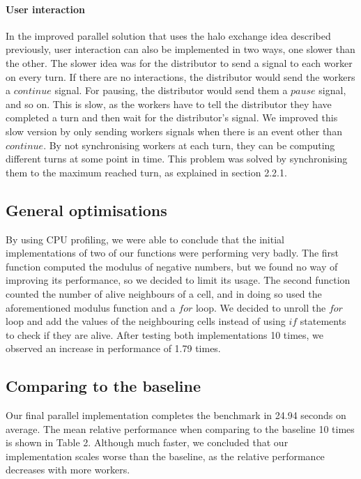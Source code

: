 \documentclass[a4, 11pt]{article}
\begin{document}
\begin{multicols}{2}
\paragraph{User interaction}
In the improved parallel solution that uses the halo exchange idea described previously, user interaction can also be implemented in two ways, one slower than the other. The slower idea was for the distributor to send a signal to each worker on every turn. If there are no interactions, the distributor would send the workers a $continue$ signal. For pausing, the distributor would send them a $pause$ signal, and so on. This is slow, as the workers have to tell the distributor they have completed a turn and then wait for the distributor's signal. We improved this slow version by only sending workers signals when there is an event other than $continue$. By not synchronising workers at each turn, they can be computing different turns at some point in time. This problem was solved by synchronising them to the maximum reached turn, as explained in section 2.2.1.

\subsection{General optimisations}
By using CPU profiling, we were able to conclude that the initial implementations of two of our functions were performing very badly. The first function computed the modulus of negative numbers, but we found no way of improving its performance, so we decided to limit its usage. The second function counted the number of alive neighbours of a cell, and in doing so used the aforementioned modulus function and a $for$ loop. We decided to unroll the $for$ loop and add the values of the neighbouring cells instead of using $if$ statements to check if they are alive. After testing both implementations 10 times, we observed an increase in performance of 1.79 times.

\subsection{Comparing to the baseline}
Our final parallel implementation completes the benchmark in 24.94 seconds on average. 
The mean relative performance when comparing to the baseline 10 times is shown in Table 2. Although much faster, we concluded that our implementation scales worse than the baseline, as the relative performance decreases with more workers.
\vspace{0.5cm}


\end{multicols}
\end{document}
